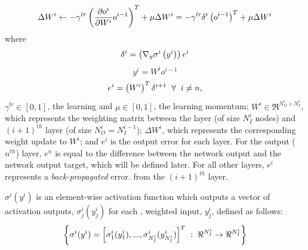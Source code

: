 		\begin{equation}
			\Delta W^{i} \leftarrow
				-\gamma^{lr} \left( \frac{ \partial o^{i} }{\partial {W^{i} } }  o^{i-1} \right)^{T}  + \mu \Delta W^{i} = 
				-\gamma^{lr} \delta^{i} \left(o^{i-1}\right)^{T}  + \mu \Delta W^{i}
			\label{eq::bp_weight_update}
		\end{equation} 
		where
		\begin{equation*}
			\delta^{i} = \left( \nabla_{y} \sigma^{i}\left(y^{i}\right) \right) e^{i}
			\label{eq::bp_error}
		\end{equation*}
		\begin{equation*}
			y^{i} = W^{i} o^{i-1}
			\label{eq::bp_error}
		\end{equation*}
		\begin{equation*}
			e^{i} =  \left( W^{i} \right)^{T} \delta^{i+1} \hspace{2mm} \forall \hspace{2mm} i\neq n,
		\end{equation*}
		$\gamma^{lr} \in [0,1]$, the learning and  $\mu \in [0,1]$, the learning momentum; $W^{i} \in \Re^{N_{O}^{i}\times N_{I}^{i}}$, which represents the weighting matrix between the \Ith layer (of size $N_{I}^{i}$ nodes) and $(i+1)^{th}$ layer (of size $N_{O}^{i}=N_{I}^{i-1}$); $\Delta W^{i}$, which represents the corresponding weight update to $W^{i}$; and $e^{i}$ is the output error for each \Ith layer. For the output ($n^{th}$) layer, $e^{n}$ is equal to the difference between the network output and the network output target, which will be defined later. For all other layers, $e^{i}$ represents a \emph{back-propagated} error. from the $(i+1)^{th}$ layer.

		$\sigma^{i}(y^{i})$ is an element-wise activation function which outputs a vector of activation outputs, $\sigma_{j}^{i}(y_{j}^{i}) $ for each \Jth, weighted input, $y_{j}^{i}$, defined as follows:
			\begin{equation}
				\left\{ \sigma^{i}(y^{i}) = \left[ \sigma_{1}^{i}(y_{1}^{i}),...,\sigma_{N_{I}^{i}}^{i}(y_{N_{I}^{i}}^{i}) \right]^{T} \hspace{1mm} : \hspace{1mm} \Re^{N_{I}^{i}} \rightarrow \Re^{N_{I}^{i}}\right\}
			\end{equation}

